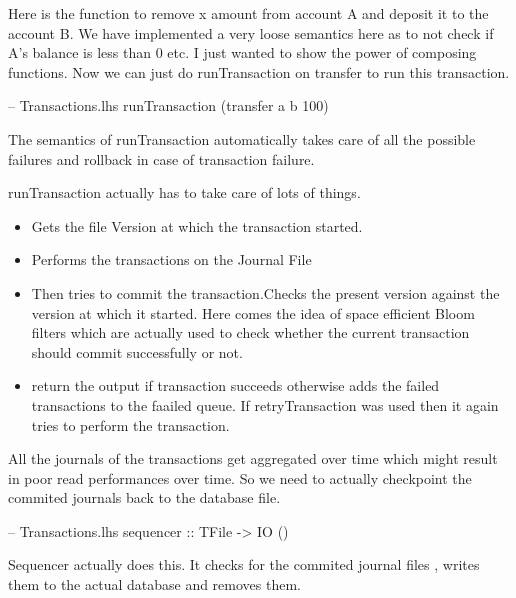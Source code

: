 \documentclass[11pt,a4paper]{article}
\begin{document}
Here is the function to remove x amount from account A and deposit it to
the account B. We have implemented a very loose semantics here as to not
check if A's balance is less than 0 etc. I just wanted to show the power
of composing functions. Now we can just do runTransaction on transfer to
run this transaction. \\
\begin{code}
-- Transactions.lhs
runTransaction (transfer a b 100)
\end{code}
The semantics of runTransaction automatically
takes care of all the possible failures and rollback in case of
transaction failure.

runTransaction actually has to take care of lots of things. 
\begin{itemize}
\item Gets the file Version at which the transaction started.
\item Performs the transactions on the Journal File 
\item Then tries to commit the transaction.Checks the present version against the version at which it started. Here comes the idea of space efficient Bloom filters which are actually used to check whether the current transaction should commit successfully or not. 
\item return the output if transaction succeeds otherwise adds the failed transactions to the faailed queue. If retryTransaction was used then it again tries to perform the transaction. 
\end{itemize}
All the journals of the transactions get aggregated over time which might result in poor read performances over time. So we need to actually checkpoint the commited journals back to the database file. \\
\begin{code}
-- Transactions.lhs
sequencer :: TFile -> IO () 
\end{code}
Sequencer actually does this. It checks for the commited journal files , writes them to the actual database and removes them. 
\end{document}

